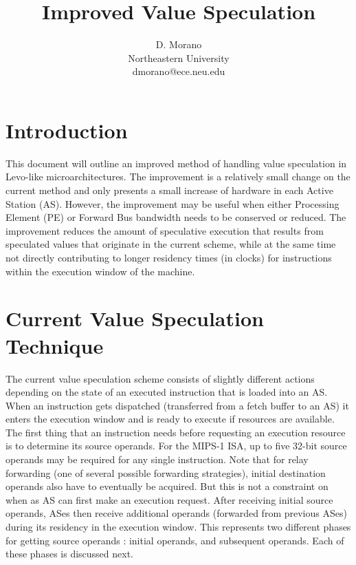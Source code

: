 \documentclass[10pt,dvips]{article}
\begin{document}
\parskip 2mm
%
%
\title{Improved Value Speculation}
%
\author{
D. Morano\\
Northeastern University\\
dmorano@ece.neu.edu\\
}
%
\maketitle
%
%
%
\section{Introduction}
%
This document will outline an improved method of handling
value speculation in Levo-like microarchitectures.
The improvement is a relatively small change on the current
method and only presents a small increase of hardware in
each Active Station (AS).
However, the improvement may be useful when either Processing Element (PE)
or Forward Bus bandwidth needs to be conserved or reduced.
The improvement reduces the amount of speculative execution that
results from speculated values that originate in the current scheme,
while at the same time not directly contributing to longer residency
times (in clocks) for instructions within the execution window 
of the machine.
%
\section{Current Value Speculation Technique}
%
The current value speculation scheme consists of slightly different
actions depending on the state of an executed instruction that
is loaded into an AS.
When an instruction gets dispatched (transferred from a fetch buffer
to an AS) it enters the execution window and is ready to execute
if resources are available.  
The first thing that an instruction
needs before requesting an execution resource is to determine
its source operands.  For the MIPS-1 ISA, up to five 32-bit source operands
may be required for any single instruction.
Note that for relay forwarding (one of several possible forwarding
strategies), initial destination operands also have to eventually be
acquired.  But this is not a constraint on when as AS can
first make an execution request.
After receiving initial source operands,
ASes then receive additional operands (forwarded from previous
ASes) during its residency in the execution window.
This represents two different phases for getting source operands :
initial operands, and subsequent operands.  Each of these phases
is discussed next.
%
\end{document}
